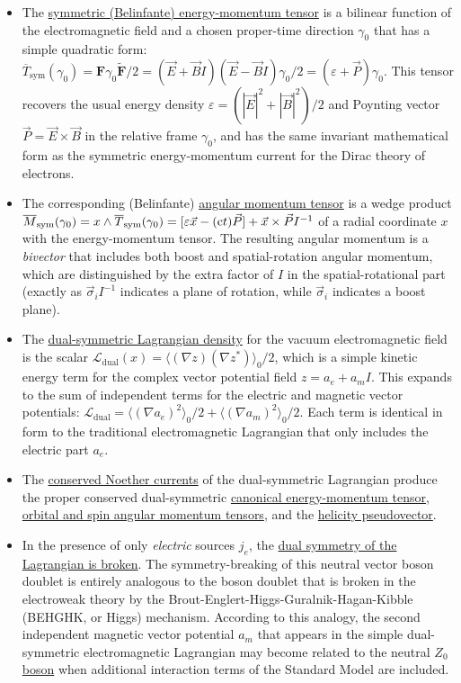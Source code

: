 \documentclass[1p,sort&compress]{elsarticle}
\numberwithin{equation}{section}
\newcommand{\rv}[1]{\vec{#1}}
\newcommand{\bv}[1]{\mathbf{#1}}
\newcommand{\mean}[1]{\langle #1 \rangle}
\newcommand{\cc}{{\rm c}}
\begin{document}
\begin{itemize}
  \item The \uline{symmetric (Belinfante) energy-momentum tensor} is a bilinear function of the electromagnetic field and a chosen proper-time direction $\gamma_0$ that has a simple quadratic form: $\overline{T}_{\text{sym}}(\gamma_0) = \bv{F}\gamma_0\tilde{\bv{F}}/2 = (\rv{E} + \rv{B}I)(\rv{E}-\rv{B}I)\gamma_0/2 = (\varepsilon + \rv{P})\gamma_0$.  This tensor recovers the usual energy density $\varepsilon = (|\rv{E}|^2 + |\rv{B}|^2)/2$ and Poynting vector $\rv{P} = \rv{E}\times\rv{B}$ in the relative frame $\gamma_0$, and has the same invariant mathematical form as the symmetric energy-momentum current for the Dirac theory of electrons.
  \item The corresponding (Belinfante) \uline{angular momentum tensor} is a wedge product $\overline{M}_{\text{sym}}(\gamma_0) = x \wedge \overline{T}_{\text{sym}}(\gamma_0) = [\varepsilon\rv{x} - (\cc t)\rv{P}] + \rv{x}\times\rv{P}I^{-1}$ of a radial coordinate $x$ with the energy-momentum tensor.  The resulting angular momentum is a \emph{bivector} that includes both boost and spatial-rotation angular momentum, which are distinguished by the extra factor of $I$ in the spatial-rotational part (exactly as $\rv{\sigma}_i I^{-1}$ indicates a plane of rotation, while $\rv{\sigma}_i$ indicates a boost plane).
  \item The \uline{dual-symmetric Lagrangian density} for the vacuum electromagnetic field is the scalar $\mathcal{L}_{\text{dual}}(x) = \mean{(\nabla z)(\nabla z^*)}_0/2$, which is a simple kinetic energy term for the complex vector potential field $z = a_e + a_m I$.  This expands to the sum of independent terms for the electric and magnetic vector potentials: $\mathcal{L}_{\text{dual}} = \mean{(\nabla a_e)^2}_0/2 + \mean{(\nabla a_m)^2}_0/2$.  Each term is identical in form to the traditional electromagnetic Lagrangian that only includes the electric part $a_e$.
  \item The \uline{conserved Noether currents} of the dual-symmetric Lagrangian produce the proper conserved dual-symmetric \uline{canonical energy-momentum tensor}, \uline{orbital and spin angular momentum tensors}, and the \uline{helicity pseudovector}.
  \item In the presence of only \emph{electric} sources $j_e$, the \uline{dual symmetry of the Lagrangian is broken}.  The symmetry-breaking of this neutral vector boson doublet is entirely analogous to the boson doublet that is broken in the electroweak theory by the Brout-Englert-Higgs-Guralnik-Hagan-Kibble (BEHGHK, or Higgs) mechanism.  According to this analogy, the second independent magnetic vector potential $a_m$ that appears in the simple dual-symmetric electromagnetic Lagrangian may become related to the neutral \uline{$Z_0$ boson} when additional interaction terms of the Standard Model are included.
\end{itemize}
\end{document}
